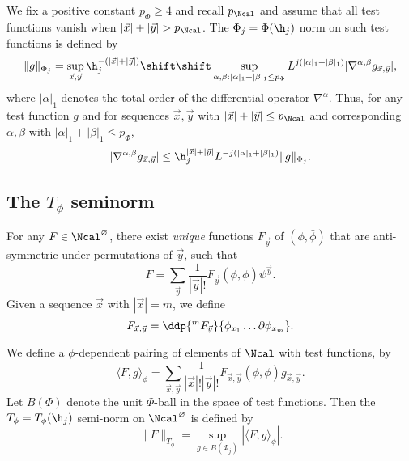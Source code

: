 We fix a positive constant $p_\Phi\ge 4$ and recall $p_\Ncal$
and assume that all test functions
vanish when $|\vec x|  +|\vec y| > p_\Ncal$.
The $\Phi_j = \Phi(\h_j)$ norm on such test functions is defined by
\begin{equation}
\|g\|_{\Phi_j}
	=
\sup_{\vec x, \vec y} \h_j^{-(|\vec x| +|\vec y|)}
	\shift\shift
\sup_{\alpha,\beta: |\alpha|_1+|\beta|_1 \le p_\Phi}
L^{j (|\alpha|_1 + |\beta|_1)}
|\nabla^{\alpha,\beta} g_{\vec x, \vec y}|,
\end{equation}
where $|\alpha|_1$ denotes the total order of the differential operator $\nabla^\alpha$.
Thus, for any test function $g$ and for sequences
$\vec x, \vec y$ with $|\vec x| +|\vec y| \leq p_\Ncal$ and
corresponding $\alpha, \beta$ with $|\alpha|_1 + |\beta|_1 \leq p_\Phi$,
\begin{equation}
\label{e:testfcnbd}
|\nabla^{\alpha,\beta} g_{\vec x,\vec y}|
	\leq
\h_j^{|\vec x| + |\vec y|} L^{-j (|\alpha|_1 + |\beta|_1)} \|g\|_{\Phi_j}.
\end{equation}

\subsection{The \texorpdfstring{$T_\phi$}{Tphi} seminorm}


For any $F \in \Ncal^\varnothing$,
there exist \emph{unique} functions $F_{\vec y}$ of $(\phi, \bar\phi)$
that are anti-symmetric under permutations of $\vec y$, such that
\begin{equation}
F = \sum_{\vec y} \frac{1}{|\vec y|!} F_{\vec y}(\phi, \bar\phi) \psi^{\vec y}.
\end{equation}
Given a sequence $\vec{x}$ with $|\vec{x}| = m$, we define
\begin{equation}
F_{\vec x, \vec y} = \ddp{^m F_{\vec y}}{\phi_{x_1} \ldots \partial\phi_{x_m}}.
\end{equation}

We define a $\phi$-dependent pairing of elements of $\Ncal$ with test functions, by
\begin{equation}
\langle F, g \rangle_\phi
  =
\sum_{\vec x, \vec y}
\frac{1}{|\vec x|! |\vec y|!}
F_{\vec x,\vec y}(\phi, \bar\phi)
g_{\vec x,\vec y}.
\end{equation}
Let $B(\Phi)$ denote the unit $\Phi$-ball in the space of test functions. Then the
$T_\phi = T_\phi(\h_j)$ semi-norm on $\Ncal^\varnothing$ is defined by
\begin{equation}
\|F\|_{T_\phi} = \sup_{g\in B(\Phi_j)} |\langle F, g \rangle_\phi|.
\end{equation}

